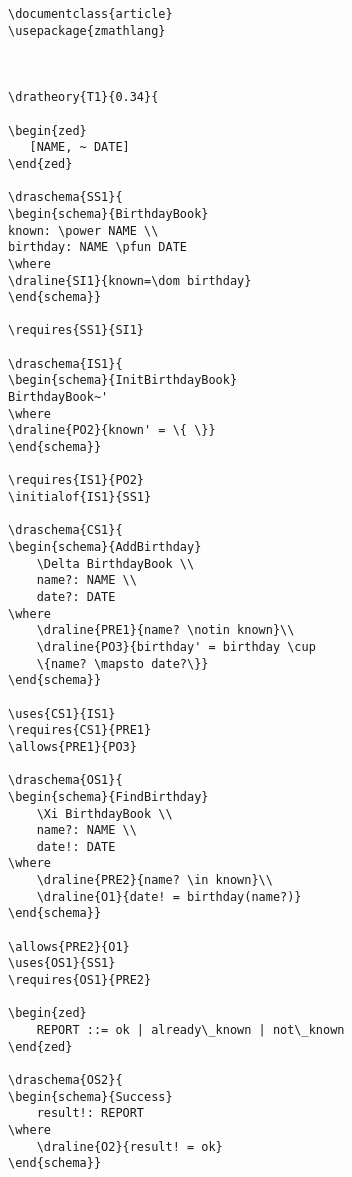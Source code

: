 \begin{verbatim}
\documentclass{article}
\usepackage{zmathlang}



\dratheory{T1}{0.34}{

\begin{zed}
   [NAME, ~ DATE] 
\end{zed}

\draschema{SS1}{
\begin{schema}{BirthdayBook}
known: \power NAME \\ 
birthday: NAME \pfun DATE 
\where 
\draline{SI1}{known=\dom birthday}
\end{schema}}

\requires{SS1}{SI1}

\draschema{IS1}{
\begin{schema}{InitBirthdayBook} 
BirthdayBook~' 
\where 
\draline{PO2}{known' = \{ \}}
\end{schema}}

\requires{IS1}{PO2}
\initialof{IS1}{SS1}

\draschema{CS1}{
\begin{schema}{AddBirthday}
    \Delta BirthdayBook \\
    name?: NAME \\
    date?: DATE
\where
    \draline{PRE1}{name? \notin known}\\
    \draline{PO3}{birthday' = birthday \cup 
    \{name? \mapsto date?\}}
\end{schema}}

\uses{CS1}{IS1}
\requires{CS1}{PRE1}
\allows{PRE1}{PO3}

\draschema{OS1}{
\begin{schema}{FindBirthday}
    \Xi BirthdayBook \\
    name?: NAME \\
    date!: DATE 
\where
    \draline{PRE2}{name? \in known}\\
    \draline{O1}{date! = birthday(name?)}
\end{schema}}

\allows{PRE2}{O1}
\uses{OS1}{SS1}
\requires{OS1}{PRE2}

\begin{zed} 
    REPORT ::= ok | already\_known | not\_known
\end{zed}

\draschema{OS2}{
\begin{schema}{Success}
    result!: REPORT
\where
    \draline{O2}{result! = ok}
\end{schema}}


\end{verbatim}
